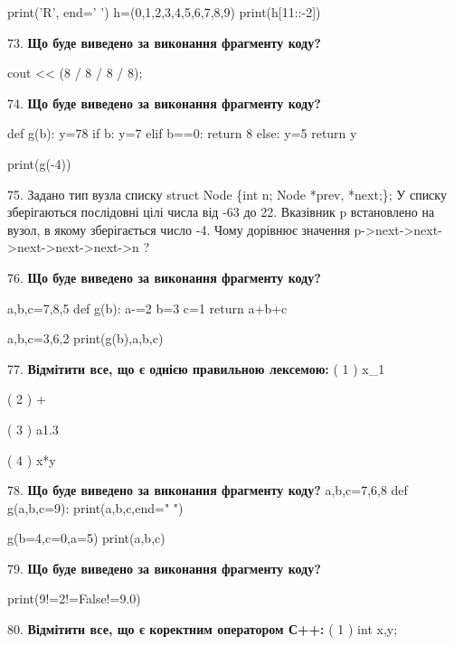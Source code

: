 \documentclass[11pt]{article}
\begin{document}
print('R', end=' ')
h=(0,1,2,3,4,5,6,7,8,9)
print(h[11::-2])

\par\vspace{5mm}
73. \textbf{Що буде виведено за виконання фрагменту коду?}

cout << (8 / 8 / 8 / 8);
\par\vspace{5mm}
74. \textbf{Що буде виведено за виконання фрагменту коду?}

def g(b):
    y=78
    if b: 
        y=7
    elif b==0:
         return 8
    else:
         y=5
    return y

print(g(-4))
\par\vspace{5mm}
75. 
Задано тип вузла списку
struct Node \{int n; Node *prev, *next;\};
У списку зберігаються послідовні цілі числа від -63 до 22. Вказівник p встановлено на вузол, в якому зберігається число -4.
Чому дорівнює значення p->next->next->next->next->next->n ?\par\vspace{5mm}
76. \textbf{Що буде виведено за виконання фрагменту коду?}

a,b,c=7,8,5
def g(b):
    a-=2
    b=3
    c=1
    return a+b+c

a,b,c=3,6,2
print(g(b),a,b,c)
\par\vspace{5mm}
77. %
\textbf{Відмітити все, що є однією правильною лексемою:}
( 1 ) x_1

( 2 ) +

( 3 ) a1.3

( 4 ) x*y
\par\vspace{5mm}
78. \textbf{Що буде виведено за виконання фрагменту коду?}
a,b,c=7,6,8
def g(a,b,c=9):
    print(a,b,c,end=" ")

g(b=4,c=0,a=5)
print(a,b,c)
\par\vspace{5mm}
79. \textbf{Що буде виведено за виконання фрагменту коду?}

print(9!=2!=False!=9.0)
\par\vspace{5mm}
80. %
\textbf{Відмітити все, що є коректним оператором С++:}
( 1 ) int x,y;
\end{document}
